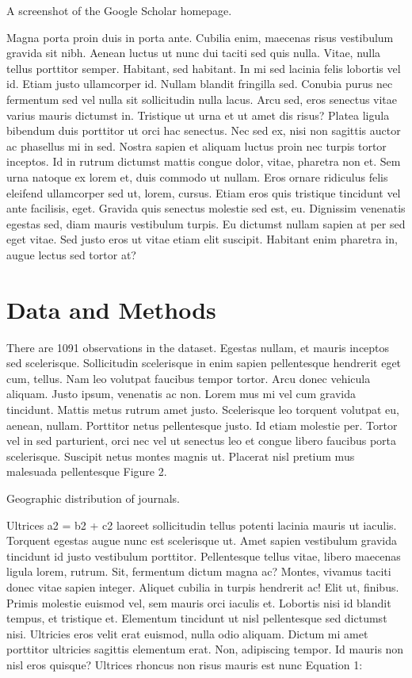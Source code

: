 \documentclass[
  12,
]{article}
\begin{document}
A screenshot of the Google Scholar homepage.

Magna porta proin duis in porta ante. Cubilia enim, maecenas risus
vestibulum gravida sit nibh. Aenean luctus ut nunc dui taciti sed quis
nulla. Vitae, nulla tellus porttitor semper. Habitant, sed habitant. In
mi sed lacinia felis lobortis vel id. Etiam justo ullamcorper id. Nullam
blandit fringilla sed. Conubia purus nec fermentum sed vel nulla sit
sollicitudin nulla lacus. Arcu sed, eros senectus vitae varius mauris
dictumst in. Tristique ut urna et ut amet dis risus? Platea ligula
bibendum duis porttitor ut orci hac senectus. Nec sed ex, nisi non
sagittis auctor ac phasellus mi in sed. Nostra sapien et aliquam luctus
proin nec turpis tortor inceptos. Id in rutrum dictumst mattis congue
dolor, vitae, pharetra non et. Sem urna natoque ex lorem et, duis
commodo ut nullam. Eros ornare ridiculus felis eleifend ullamcorper sed
ut, lorem, cursus. Etiam eros quis tristique tincidunt vel ante
facilisis, eget. Gravida quis senectus molestie sed est, eu. Dignissim
venenatis egestas sed, diam mauris vestibulum turpis. Eu dictumst nullam
sapien at per sed eget vitae. Sed justo eros ut vitae etiam elit
suscipit. Habitant enim pharetra in, augue lectus sed tortor at?

\hypertarget{data-and-methods}{%
\section{Data and Methods}\label{data-and-methods}}

There are 1091 observations in the dataset. Egestas nullam, et mauris
inceptos sed scelerisque. Sollicitudin scelerisque in enim sapien
pellentesque hendrerit eget cum, tellus. Nam leo volutpat faucibus
tempor tortor. Arcu donec vehicula aliquam. Justo ipsum, venenatis ac
non. Lorem mus mi vel cum gravida tincidunt. Mattis metus rutrum amet
justo. Scelerisque leo torquent volutpat eu, aenean, nullam. Porttitor
netus pellentesque justo. Id etiam molestie per. Tortor vel in sed
parturient, orci nec vel ut senectus leo et congue libero faucibus porta
scelerisque. Suscipit netus montes magnis ut. Placerat nisl pretium mus
malesuada pellentesque Figure 2.

Geographic distribution of journals.

Ultrices a2 = b2 + c2 laoreet sollicitudin tellus potenti lacinia mauris
ut iaculis. Torquent egestas augue nunc est scelerisque ut. Amet sapien
vestibulum gravida tincidunt id justo vestibulum porttitor. Pellentesque
tellus vitae, libero maecenas ligula lorem, rutrum. Sit, fermentum
dictum magna ac? Montes, vivamus taciti donec vitae sapien integer.
Aliquet cubilia in turpis hendrerit ac! Elit ut, finibus. Primis
molestie euismod vel, sem mauris orci iaculis et. Lobortis nisi id
blandit tempus, et tristique et. Elementum tincidunt ut nisl
pellentesque sed dictumst nisi. Ultricies eros velit erat euismod, nulla
odio aliquam. Dictum mi amet porttitor ultricies sagittis elementum
erat. Non, adipiscing tempor. Id mauris non nisl eros quisque? Ultrices
rhoncus non risus mauris est nunc Equation 1:
\end{document}
